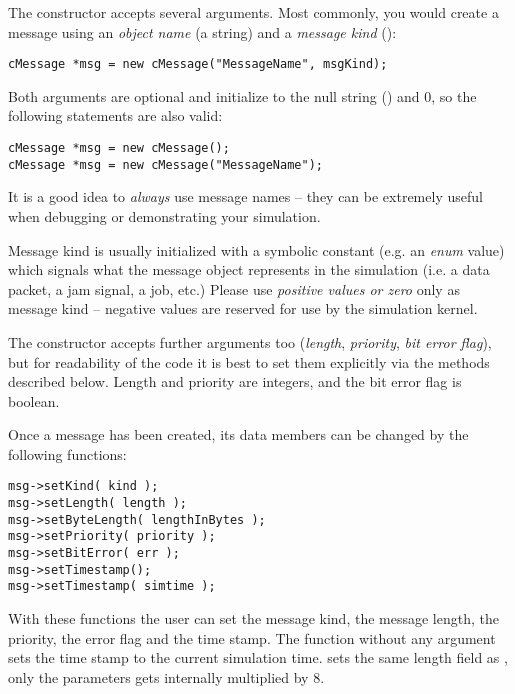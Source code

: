 The  constructor accepts several arguments.
Most commonly, you would create a message using an \textit{object name}
(a  string) and a \textit{message kind} ():

\begin{verbatim}
cMessage *msg = new cMessage("MessageName", msgKind);
\end{verbatim}

Both arguments are optional and initialize to the null string ()
and 0, so the following statements are also valid:

\begin{verbatim}
cMessage *msg = new cMessage();
cMessage *msg = new cMessage("MessageName");
\end{verbatim}

It is a good idea to \textit{always} use message names -- they can be
extremely useful when debugging or demonstrating your simulation.

Message kind is usually initialized with a symbolic constant
(e.g. an \textit{enum} value) which signals what the message object
represents in the simulation (i.e. a data packet, a jam signal, a job, etc.)
Please use \textit{positive values or zero} only as message kind --
negative values are reserved for use by the simulation kernel.


The  constructor accepts further arguments too
(\textit{length}, \textit{priority}, \textit{bit error flag}),
but for readability of the code it is best to set them explicitly
via the  methods described below.
Length and priority are integers, and the bit error flag is boolean.


Once a message has been created, its data members can be changed by the following functions:

\begin{verbatim}
msg->setKind( kind );
msg->setLength( length );
msg->setByteLength( lengthInBytes );
msg->setPriority( priority );
msg->setBitError( err );
msg->setTimestamp();
msg->setTimestamp( simtime );
\end{verbatim}

With these functions the user can set the message
kind, the message length,
the priority, the error
flag and the time stamp. The  function without any argument
sets the time stamp to the current simulation time.
 sets the same length field as ,
only the parameters gets internally multiplied by 8.

